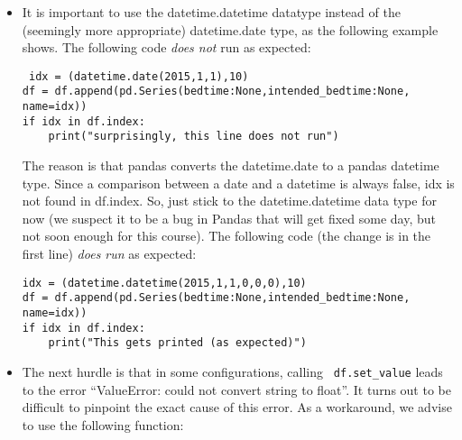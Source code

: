 \documentclass[a4paper]{report}
\theoremstyle{definition}
\newcommand{\doublequote}{\texttt{"}}
\newcommand{\singlequote}{\char13}
\begin{document}
\begin{itemize}
\setlength\itemsep{1mm}

\item It is important to use the datetime.datetime datatype instead of
the (seemingly more appropriate) datetime.date type, as the following
example shows. The following code \emph{does not} run as expected:

\texttt{\small
idx = (datetime.date(2015,1,1),10)\\
df = df.append(pd.Series({\singlequote{}bedtime\singlequote{}:None,\singlequote{}intended\_bedtime\singlequote{}:None}, name=idx))\\
if idx in df.index:\\
\mbox{}~~~~print(\doublequote{}surprisingly, this line does not
run\doublequote{})
}

The reason is that pandas converts the
datetime.date to a pandas datetime type. Since a comparison between a date
and a datetime is always false, idx is not found in df.index. So, just stick
to the datetime.datetime data type for now (we suspect it to be a bug in
Pandas that will get fixed some day, but not soon enough for this course).
The following code (the change is in the first line) \emph{does run} as
expected:

\texttt{\small idx = (datetime.datetime(2015,1,1,0,0,0),10)\\
df = df.append(pd.Series({\singlequote{}bedtime\singlequote{}:None,\singlequote{}intended\_bedtime\singlequote{}:None}, name=idx))\\
if idx in df.index:\\
\mbox{}~~~~print(\doublequote{}This gets printed (as expected)\doublequote{})
}


\item The next hurdle is that in some configurations, calling \texttt{\small
df.set\_value} leads to
the error ``ValueError: could not convert string to float''. It turns
out to be difficult to pinpoint the exact cause of this error. As a
workaround, we advise to use the following function:


\end{itemize}
\end{document}
